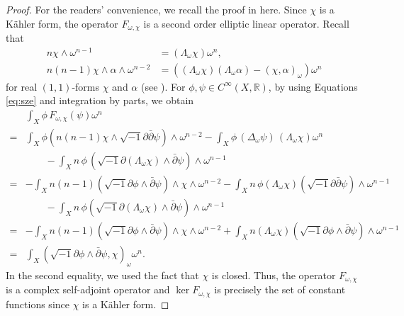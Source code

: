 \documentclass{amsart}
\numberwithin{equation}{section}
\theoremstyle{plain}
\theoremstyle{definition}
\theoremstyle{remark}
\begin{document}
\begin{proof}
For the readers' convenience, we recall the proof in \cite{Hashimoto2018} here.
Since $\chi$ is a K{\"a}hler form, the operator $F_{\omega, \chi}$ is a second order elliptic linear operator.
Recall that 
\begin{equation}\label{eq:sze}
\begin{aligned}
n \chi \wedge \omega^{n-1} &= (\Lambda_\omega \chi) \omega^n, \\ 
n(n-1) \chi \wedge \alpha \wedge \omega^{n-2} 
&= \left( \left( \Lambda_\omega \chi \right) \left( \Lambda_\omega \alpha \right) - \left( \chi, \alpha \right)_\omega \right) \omega^n
\end{aligned}
\end{equation}
for real $(1, 1)$-forms $\chi$ and $\alpha$ (see \cite[Lemma 4.7]{szekelyhidi2014introduction}).
For $\phi, \psi \in C^{\infty}(X, \mathbb{R}) $,
by using Equations \eqref{eq:sze} and integration by parts, we obtain 
\begin{align*}
& \int_X {\phi \, F_{\omega, \chi} (\psi)} \omega^{n} \\
=&\int_X \phi \left( n \left(n-1 \right) \chi \wedge {\sqrt{-1} \partial \bar{\partial} \psi} \right) \wedge \omega^{n-2} 
- \int_X \phi \, \left( \Delta_\omega \psi \right) \, (\Lambda_\omega \chi) \omega^n \\
& \qquad - \int_X n \, \phi \, \left( \sqrt{-1} \partial \left( \Lambda_\omega \chi \right) \wedge \bar{\partial}\psi \right) \wedge \omega^{n-1} \\
= &- \int_X n \left( n-1 \right) \left( \sqrt{-1} \partial \phi \wedge \bar{\partial} \psi \right) \wedge \chi \wedge \omega^{n-2}
 - \int_X n \, \phi \left( \Lambda_\omega \chi \right) \left( \sqrt{-1} \partial \bar{\partial} \psi \right) \wedge \omega^{n-1} \\
& \qquad - \int_X n \, \phi \left( \sqrt{-1} \partial \left( \Lambda_\omega \chi \right) \wedge \bar{\partial}\psi \right) \wedge \omega^{n-1} \\
= &- \int_X n \left( n-1 \right) \left( \sqrt{-1} \partial \phi \wedge \bar{\partial} \psi \right) \wedge \chi \wedge \omega^{n-2} 
+ \int_X n \left( \Lambda_\omega \chi \right) \left( \sqrt{-1} \partial \phi \wedge \bar{\partial} \psi \right) \wedge \omega^{n-1} \\
= &\int_X \left( \sqrt{-1} \partial \phi \wedge \bar{\partial} \psi , \chi \right)_\omega \omega^n.
\end{align*}
In the second equality, we used the fact that $\chi$ is closed.
Thus, the operator $F_{\omega, \chi}$ is a complex self-adjoint operator and $\mathop{\mathrm{ker}}F_{\omega, \chi}$ is precisely the set of constant functions since $\chi$ is a K{\"a}hler form.
\end{proof}
\end{document}
